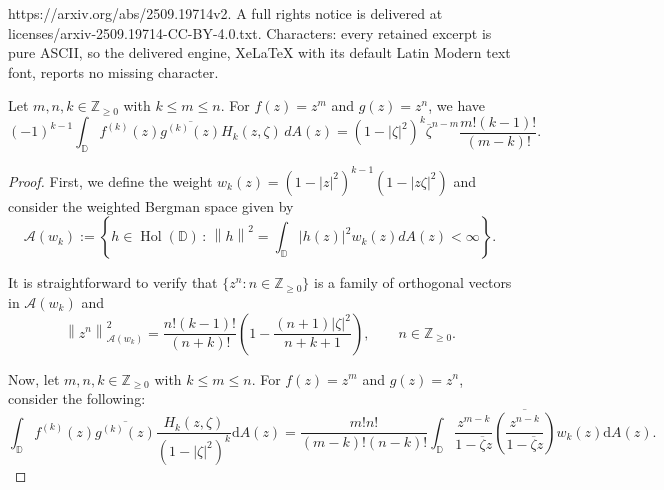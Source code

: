 \documentclass[10pt,a4paper]{amsart}
\newcommand{\D}{\mathbb D}
\newcommand{\abs}[1]{\left\lvert #1 \right\rvert}
\newcommand{\calA}{{\mathcal{A}}}
\newcommand{\norm}[1]{\left\lVert #1 \right\rVert}
\renewcommand{\ge}{\geqslant}
\renewcommand{\le}{\leqslant}
\begin{document}
https://arxiv.org/abs/2509.19714v2. A full rights notice is delivered at licenses/arxiv-2509.19714-CC-BY-4.0.txt. Characters: every retained excerpt is pure ASCII, so the delivered engine, XeLaTeX with its default Latin Modern text font, reports no missing character.
 \begin{lemma}\label{lem:H_k-space}
    Let $m, n, k \in \mathbb{Z}_{\ge 0}$ with $k \le m \le n$. For $f(z) = z^m$ and $g(z) = z^n$, we have
    \begin{equation*}
        (-1)^{k-1} \int_{\D} f^{(k)}(z) \overline{g^{(k)}(z)}  H_k(z, \zeta) \, dA(z) =  (1-|\zeta|^2)^{k} \overline{\zeta}^{n-m} \frac{m! (k-1)!}{(m-k)!}.
    \end{equation*}
\end{lemma}

\begin{proof}

    First, we define the weight $w_{k} \left( z \right) = \left( 1-\abs{z}^{2}  \right)^{k-1} \left( 1-\abs{z\zeta}^{2} \right)$ and consider the weighted Bergman space given by 
    \begin{equation*}
        \calA (w_{k}) := \left\{ h \in \operatorname{Hol}\left( \D \right) \, : \, \norm{h}^{2} = \int_{\D} \abs{h\left( z \right)}^{2} w_{k} \left( z \right) dA\left( z \right) < \infty \right\}.
    \end{equation*}

    It is straightforward to verify that $\{z^n: n\in \mathbb Z_{\geqslant 0}\}$ is a family of orthogonal vectors in $ \calA (w_{k})$ and 
    \begin{equation*}
        \norm{z^{n}}_{\calA \left( w_{k} \right)} ^{2} =  \frac{n! (k-1)!}{(n+k)!} \left( 1- \frac{\left( n+1 \right) \abs{\zeta}^{2}}{n+k+1} \right),\qquad n\in \mathbb Z_{\geqslant 0}.
    \end{equation*}

    

    Now, let $m, n, k \in \mathbb{Z}_{\ge 0}$ with $k \le m \le n$. For $f(z) = z^m$ and $g(z) = z^n$, consider the following:
    \begin{equation}
        \int_{\D} f^{(k)}\left( z \right) \overline{g^{(k)} \left( z \right)} \frac{H_{k} \left( z, \zeta \right)}{ ( 1- \abs{\zeta}^{2} )^{k}} \mathrm{d}A\left( z \right)
         =  \frac{m! n!}{(m-k)! (n-k)!} \int_{\D} \frac{z^{m-k}}{1-\overline{\zeta} z} \overline{\left(  \frac{z^{n-k}}{1-\overline{\zeta} z} \right)} w_{k} \left( z \right) \mathrm{d}A \left( z \right).
         \label{eqn:monomial_H_k-1}
    \end{equation}


\end{proof}
\end{document}
